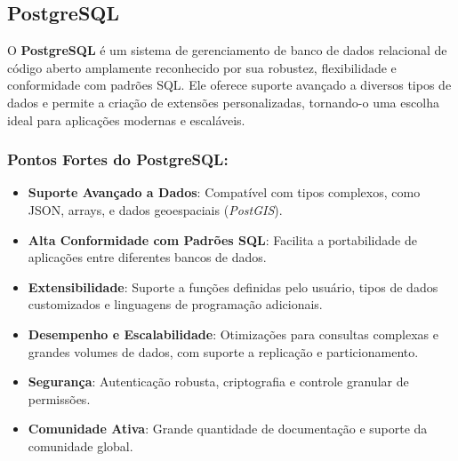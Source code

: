 \subsection{PostgreSQL}

O \textbf{PostgreSQL} é um sistema de gerenciamento de banco de dados relacional de código aberto amplamente reconhecido por sua robustez, flexibilidade e conformidade com padrões SQL. Ele oferece suporte avançado a diversos tipos de dados e permite a criação de extensões personalizadas, tornando-o uma escolha ideal para aplicações modernas e escaláveis.

\subsubsection*{Pontos Fortes do PostgreSQL:}
\begin{itemize}
    \item \textbf{Suporte Avançado a Dados}: Compatível com tipos complexos, como JSON, arrays, e dados geoespaciais (\textit{PostGIS}).
    \item \textbf{Alta Conformidade com Padrões SQL}: Facilita a portabilidade de aplicações entre diferentes bancos de dados.
    \item \textbf{Extensibilidade}: Suporte a funções definidas pelo usuário, tipos de dados customizados e linguagens de programação adicionais.
    \item \textbf{Desempenho e Escalabilidade}: Otimizações para consultas complexas e grandes volumes de dados, com suporte a replicação e particionamento.
    \item \textbf{Segurança}: Autenticação robusta, criptografia e controle granular de permissões.
    \item \textbf{Comunidade Ativa}: Grande quantidade de documentação e suporte da comunidade global.
\end{itemize}

